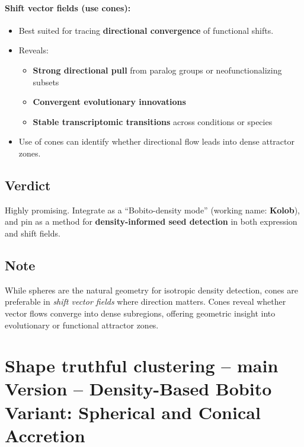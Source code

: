         \paragraph{Shift vector fields (use cones):}
        \begin{itemize}
            \item Best suited for tracing \textbf{directional convergence} of functional shifts.
            \item Reveals:
                  \begin{itemize}
                      \item \textbf{Strong directional pull} from paralog groups or neofunctionalizing subsets
                      \item \textbf{Convergent evolutionary innovations}
                      \item \textbf{Stable transcriptomic transitions} across conditions or species
                  \end{itemize}
            \item Use of cones can identify whether directional flow leads into dense attractor zones.
        \end{itemize}

    \subsection{Verdict}
        Highly promising. Integrate as a ``Bobito-density mode'' (working name: \textbf{Kolob}), and pin as a method for \textbf{density-informed seed detection} in both expression and shift fields.

    \subsection{Note}
        While spheres are the natural geometry for isotropic density detection, cones are preferable in \emph{shift vector fields} where direction matters. Cones reveal whether vector flows converge into dense subregions, offering geometric insight into evolutionary or functional attractor zones.



\section{Shape truthful clustering -- main Version -- Density-Based Bobito Variant: Spherical and Conical Accretion}

